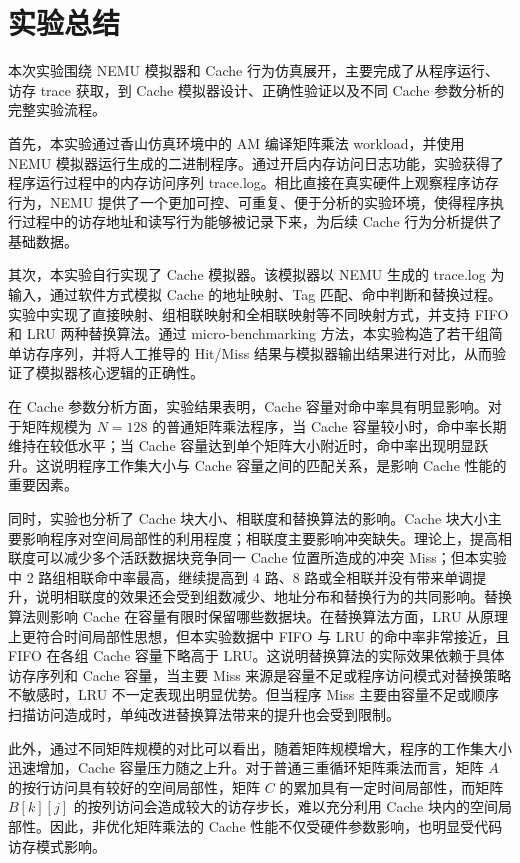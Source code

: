 \section{实验总结}

本次实验围绕 NEMU 模拟器和 Cache 行为仿真展开，主要完成了从程序运行、访存 trace 获取，到 Cache 模拟器设计、正确性验证以及不同 Cache 参数分析的完整实验流程。

首先，本实验通过香山仿真环境中的 AM 编译矩阵乘法 workload，并使用 NEMU 模拟器运行生成的二进制程序。通过开启内存访问日志功能，实验获得了程序运行过程中的内存访问序列 trace.log。相比直接在真实硬件上观察程序访存行为，NEMU 提供了一个更加可控、可重复、便于分析的实验环境，使得程序执行过程中的访存地址和读写行为能够被记录下来，为后续 Cache 行为分析提供了基础数据。

其次，本实验自行实现了 Cache 模拟器。该模拟器以 NEMU 生成的 trace.log 为输入，通过软件方式模拟 Cache 的地址映射、Tag 匹配、命中判断和替换过程。实验中实现了直接映射、组相联映射和全相联映射等不同映射方式，并支持 FIFO 和 LRU 两种替换算法。通过 micro-benchmarking 方法，本实验构造了若干组简单访存序列，并将人工推导的 Hit/Miss 结果与模拟器输出结果进行对比，从而验证了模拟器核心逻辑的正确性。

在 Cache 参数分析方面，实验结果表明，Cache 容量对命中率具有明显影响。对于矩阵规模为 $N=128$ 的普通矩阵乘法程序，当 Cache 容量较小时，命中率长期维持在较低水平；当 Cache 容量达到单个矩阵大小附近时，命中率出现明显跃升。这说明程序工作集大小与 Cache 容量之间的匹配关系，是影响 Cache 性能的重要因素。

同时，实验也分析了 Cache 块大小、相联度和替换算法的影响。Cache 块大小主要影响程序对空间局部性的利用程度；相联度主要影响冲突缺失。理论上，提高相联度可以减少多个活跃数据块竞争同一 Cache 位置所造成的冲突 Miss；但本实验中 2 路组相联命中率最高，继续提高到 4 路、8 路或全相联并没有带来单调提升，说明相联度的效果还会受到组数减少、地址分布和替换行为的共同影响。替换算法则影响 Cache 在容量有限时保留哪些数据块。在替换算法方面，LRU 从原理上更符合时间局部性思想，但本实验数据中 FIFO 与 LRU 的命中率非常接近，且 FIFO 在各组 Cache 容量下略高于 LRU。这说明替换算法的实际效果依赖于具体访存序列和 Cache 容量，当主要 Miss 来源是容量不足或程序访问模式对替换策略不敏感时，LRU 不一定表现出明显优势。但当程序 Miss 主要由容量不足或顺序扫描访问造成时，单纯改进替换算法带来的提升也会受到限制。

此外，通过不同矩阵规模的对比可以看出，随着矩阵规模增大，程序的工作集大小迅速增加，Cache 容量压力随之上升。对于普通三重循环矩阵乘法而言，矩阵 $A$ 的按行访问具有较好的空间局部性，矩阵 $C$ 的累加具有一定时间局部性，而矩阵 $B[k][j]$ 的按列访问会造成较大的访存步长，难以充分利用 Cache 块内的空间局部性。因此，非优化矩阵乘法的 Cache 性能不仅受硬件参数影响，也明显受代码访存模式影响。

